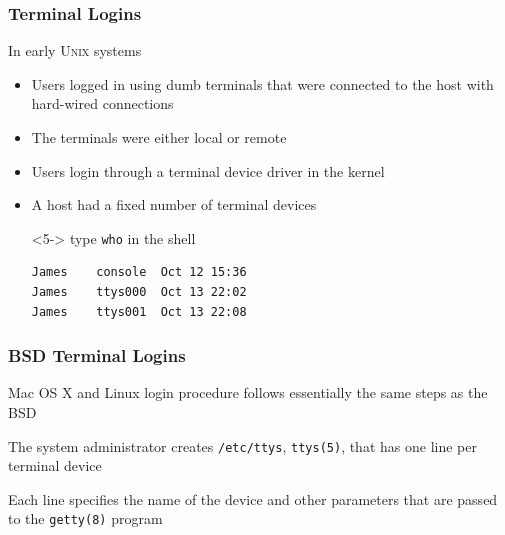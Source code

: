 \documentclass[newPxFont,sthlmFooter,nooffset]{beamer}
\begin{document}
\begin{frame}[fragile,t]
  \frametitle{Terminal Logins}
In early \textsc{Unix} systems
\begin{itemize}
\item <1-> Users logged in using dumb terminals that were connected to the host with hard-wired connections
\item <2-> The terminals were either local or remote
\item <3-> Users login through a terminal device driver in the kernel
\item <4-> A host had a fixed number of terminal devices

\item [ ] <5-> type \texttt{who} in the shell
\begin{verbatim}
James    console  Oct 12 15:36
James    ttys000  Oct 13 22:02
James    ttys001  Oct 13 22:08
\end{verbatim}
\end{itemize}
\end{frame}


\begin{frame}[t]
  \frametitle{BSD Terminal Logins}

Mac OS X and Linux login procedure follows essentially the same steps as the BSD

The system administrator creates \texttt{/etc/ttys}, \texttt{ttys(5)}, that has one line per terminal device

Each line specifies the name of the device and other parameters that are passed to the \texttt{getty(8)} program
\end{frame}
\end{document}
